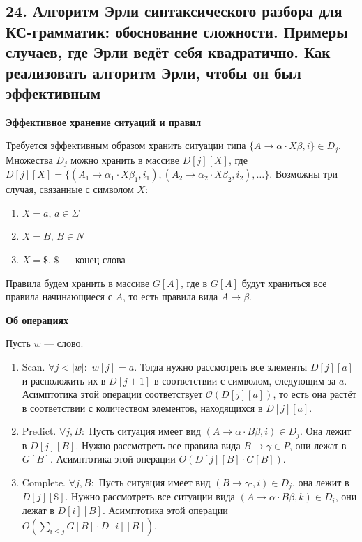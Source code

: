 \subsection{24. Алгоритм Эрли синтаксического разбора для КС-грамматик: обоснование сложности. Примеры случаев, где Эрли ведёт себя квадратично. Как реализовать алгоритм Эрли, чтобы он был эффективным}

\textbf{Эффективное хранение ситуаций и правил}

Требуется эффективным образом хранить ситуации типа $\{A \rightarrow \alpha \cdot X \beta, i\} \in D_j$. Множества $D_j$ можно хранить в массиве $D[j][X]$, где $D[j][X] = \{(A_1 \rightarrow \alpha_1 \cdot X \beta_1, i_1), (A_2 \rightarrow \alpha_2 \cdot X \beta_2, i_2), \dots \}$. Возможны три случая, связанные с символом $X$:

\begin{enumerate}
    \item $X = a$, $a \in \Sigma$
    
    \item $X = B$, $B \in N$
    
    \item $X = \$$, $\$$ — конец слова
\end{enumerate}

Правила будем хранить в массиве $G[A]$, где в $G[A]$ будут храниться все правила начинающиеся с $A$, то есть правила вида $A \rightarrow \beta$.

\textbf{Об операциях}

Пусть $w$ — слово.
\begin{enumerate}
\item Scan. $\forall j < |w|:$ $w[j] = a$. Тогда нужно рассмотреть все элементы $D[j][a]$ и расположить их в $D[j + 1]$ в соответствии с символом, следующим за $a$. Асимптотика этой операции соответствует $\mathcal{O} (D[j][a])$, то есть она растёт в соответствии с количеством элементов, находящихся в $D[j][a]$.

\item Predict. $\forall j, B:$ Пусть ситуация имеет вид $(A \rightarrow \alpha \cdot B \beta, i) \in D_j$. Она лежит в $D[j][B]$. Нужно рассмотреть все правила вида $B \rightarrow \gamma \in P$, они лежат в $G[B]$. Асимптотика этой операции $O(D[j][B] \cdot G[B])$.

\item Complete. $\forall j, B:$ Пусть ситуация имеет вид $(B \rightarrow \gamma \cdot, i) \in D_j$, она лежит в $D[j][\$]$. Нужно рассмотреть все ситуации вида $(A \rightarrow \alpha \cdot B \beta, k) \in D_i$, они лежат в $D[i][B]$. Асимптотика этой операции $O(\sum_{i \leq j} G[B] \cdot D[i][B])$.
\end{enumerate}

